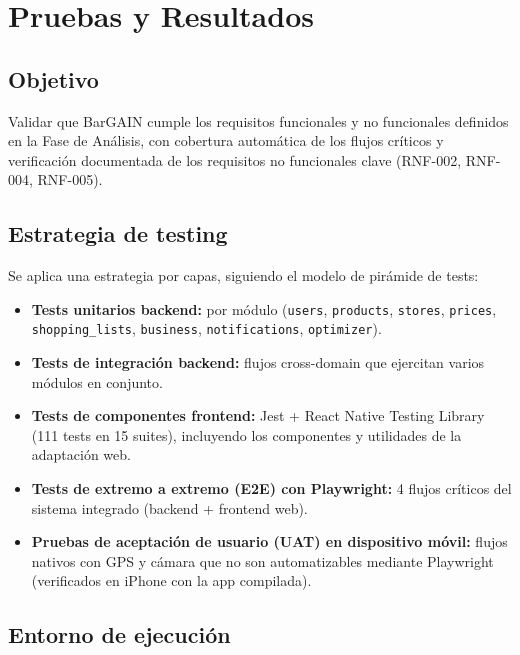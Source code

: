
\chapter{Pruebas y Resultados}\label{cap10}

\section{Objetivo}\label{sec:pruebas-objetivo}

Validar que BarGAIN cumple los requisitos funcionales y no funcionales definidos en la Fase de
An\'alisis, con cobertura autom\'atica de los flujos cr\'iticos y verificaci\'on documentada de los
requisitos no funcionales clave (RNF-002, RNF-004, RNF-005).

\section{Estrategia de testing}\label{sec:estrategia}

Se aplica una estrategia por capas, siguiendo el modelo de pir\'amide de tests:

\begin{itemize}
  \item \textbf{Tests unitarios backend:} por m\'odulo (\texttt{users}, \texttt{products},
    \texttt{stores}, \texttt{prices}, \texttt{shopping\_lists}, \texttt{business},
    \texttt{notifications}, \texttt{optimizer}).
  \item \textbf{Tests de integraci\'on backend:} flujos cross-domain que ejercitan varios m\'odulos
    en conjunto.
  \item \textbf{Tests de componentes frontend:} Jest + React Native Testing Library
    (111 tests en 15 suites), incluyendo los componentes y utilidades de la adaptaci\'on web.
  \item \textbf{Tests de extremo a extremo (E2E) con Playwright:} 4 flujos cr\'iticos del sistema
    integrado (backend + frontend web).
  \item \textbf{Pruebas de aceptaci\'on de usuario (UAT) en dispositivo m\'ovil:} flujos nativos
    con GPS y c\'amara que no son automatizables mediante Playwright (verificados en iPhone con la
    app compilada).
\end{itemize}

\section{Entorno de ejecuci\'on}\label{sec:entorno-pruebas}

